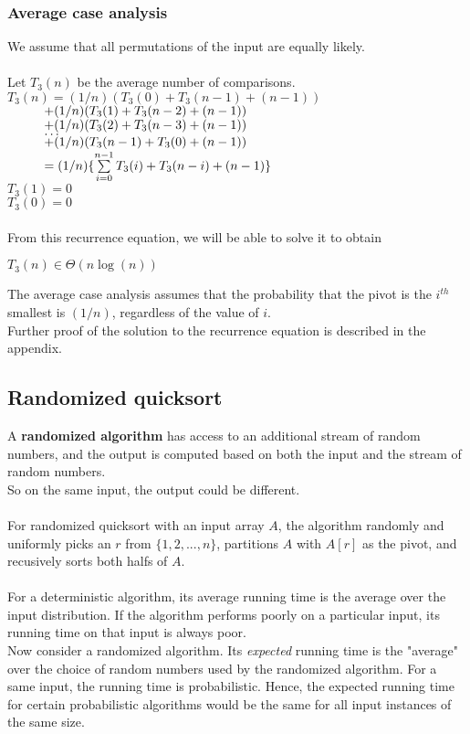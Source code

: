 \documentclass[a4paper]{article}
\begin{document}
\subsubsection{Average case analysis}
We assume that all permutations of the input are equally likely.\\ \\
Let $T_3(n)$ be the average number of comparisons.\\
$T_3(n) = (1/n)(T_3(0) + T_3(n-1) + (n-1))$\\$
\hspace*{1cm} + (1/n) (T_3(1) + T_3(n-2) + (n-1))$\\$
\hspace*{1cm} + (1/n) (T_3(2) + T_3(n-3) + (n-1))$\\$
\hspace*{1cm}\dots $\\$
\hspace*{1cm} + (1/n) (T_3(n-1) + T_3(0) + (n-1))$\\$
\hspace*{1cm}= (1/n)\{\sum\limits_{i=0}^{n-1}T_3(i) + T_3(n-i) + (n-1)\}$\\
$T_3(1) = 0$\\
$T_3(0) = 0$\\
\\From this recurrence equation, we will be able to solve it to obtain 
\begin{center}
	$T_3(n) \in \Theta(n \log(n))$
\end{center}
The average case analysis assumes that the probability that the pivot is the $i^{th}$ smallest is $(1/n)$, regardless of the value of $i$.\\ Further proof of the solution to the recurrence equation is described in the appendix.
\subsection{Randomized quicksort}
A \textbf{randomized algorithm} has access to an additional stream of random numbers, and the output is computed based on both the input and the stream of random numbers.\\
So on the same input, the output could be different.\\
\\ For randomized quicksort with an input array $A$, the algorithm randomly and uniformly picks an $r$ from $\{1, 2,..., n\}$, partitions $A$ with $A[r]$ as the pivot, and recusively sorts both halfs of $A$.\\
\\For a deterministic algorithm, its average running time is the average over the input distribution. If the algorithm performs poorly on a particular input, its running time on that input is always poor.\\
Now consider a randomized algorithm. Its \textit{expected} running time is the "average" over the choice of random numbers used by the randomized algorithm. For a same input, the running time is probabilistic. Hence, the expected running time for certain probabilistic algorithms would be the same for all input instances of the same size.
\end{document}
